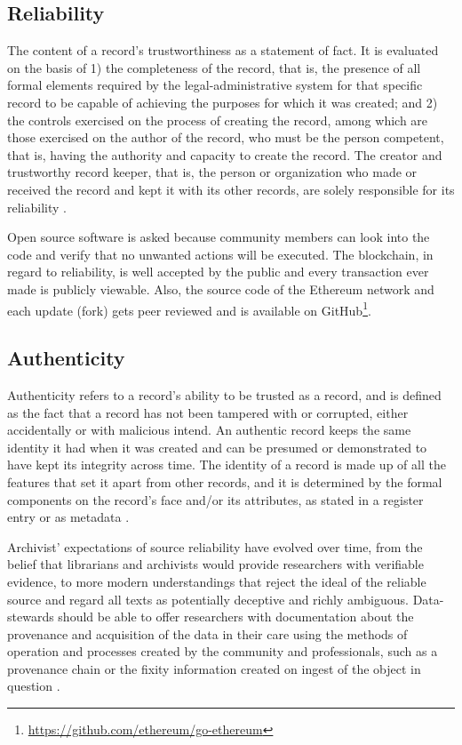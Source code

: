 \subsection{Reliability}
The content of a record's trustworthiness as a statement of fact. It is evaluated on the basis of 1) the completeness of the record, that is, the presence of all formal elements required by the legal-administrative system for that specific record to be capable of achieving the purposes for which it was created; and 2) the controls exercised on the process of creating the record, among which are those exercised on the author of the record, who must be the person competent, that is, having the authority and capacity to create the record.
The creator and trustworthy record keeper, that is, the person or organization who made or received the record and kept it with its other records, are solely responsible for its reliability \cite[52]{duranti2009digital}.

Open source software is asked because community members can look into the code and verify that no unwanted actions will be executed. The blockchain, in regard to reliability, is well accepted by the public and every transaction ever made is publicly viewable. Also, the source code of the Ethereum network and each update (fork) gets peer reviewed and is available on GitHub\footnote{\url{https://github.com/ethereum/go-ethereum}}.


\subsection{Authenticity}
Authenticity refers to a record's ability to be trusted as a record, and is defined as the fact that a record has not been tampered with or corrupted, either accidentally or with malicious intend. An authentic record keeps the same identity it had when it was created and can be presumed or demonstrated to have kept its integrity across time. The identity of a record is made up of all the features that set it apart from other records, and it is determined by the formal components on the record's face and/or its attributes, as stated in a register entry or as metadata \cite[52]{duranti2009digital}.

Archivist' expectations of source reliability have evolved over time, from the belief that librarians and archivists would provide researchers with verifiable evidence, to more modern understandings that reject the ideal of the reliable source and regard all texts as potentially deceptive and richly ambiguous. Data-stewards should be able to offer researchers with documentation about the provenance and acquisition of the data in their care using the methods of operation and processes created by the community and professionals, such as a provenance chain or the fixity information created on ingest of the object in question \cite[32]{kirschenbaum2010digital}.

